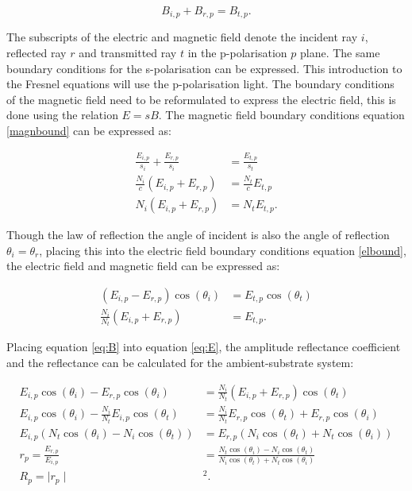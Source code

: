 \documentclass[MasterThesisMain.tex]{subfiles}
\begin{document}
\begin{equation} \label{magnbound}
B_{i,p} + B_{r,p} = B_{t,p}.
\end{equation}

The subscripts of the electric and magnetic field denote the incident ray $i$, reflected ray $r$ and transmitted ray $t$ in the p-polarisation $p$ plane. The same boundary conditions for the s-polarisation can be expressed. This introduction to the Fresnel equations will use the p-polarisation light. The boundary conditions of the magnetic field need to be reformulated to express the electric field, this is done using the relation $E=sB$. The magnetic field boundary conditions equation \ref{magnbound} can be expressed as:

\begin{align}
\frac{E_{i,p}}{s_i} + \frac{E_{r,p}}{s_i} &= \frac{E_{t,p}}{s_t}\\
\frac{N_i}{c}(E_{i,p}+E_{r,p}) &= \frac{N_t}{c}E_{t,p}\\
N_i(E_{i,p}+E_{r,p}) &= N_tE_{t,p}.
\end{align} 

Though the law of reflection the angle of incident is also the angle of reflection $\theta_i=\theta_r$, placing this into the electric field boundary conditions equation \ref{elbound}, the electric field and magnetic field can be expressed as:

\begin{align}
(E_{i,p}-E_{r,p})\cos(\theta_i) &= E_{t,p}\cos(\theta_t) \label{eq:E}\\
\frac{N_i}{N_t}(E_{i,p}+E_{r,p}) &= E_{t,p}. \label{eq:B}
\end{align}

Placing equation \ref{eq:B} into equation \ref{eq:E}, the amplitude reflectance coefficient and the reflectance can be calculated for the ambient-substrate system:

\begin{align}
E_{i,p}\cos(\theta_i)-E_{r,p}\cos(\theta_i) &= \frac{N_i}{N_t}(E_{i,p}+E_{r,p}) \cos(\theta_t) \\
E_{i,p}\cos(\theta_i) - \frac{N_i}{N_t}E_{i,p} \cos(\theta_t) &= \frac{N_i}{N_t}E_{r,p} \cos(\theta_t) + E_{r,p} \cos(\theta_i)\\
E_{i,p}(N_t\cos(\theta_i)-N_i\cos(\theta_t)) &= E_{r,p}(N_i\cos(\theta_t)+N_t\cos(\theta_i))\\
r_p = \frac{E_{r,p}}{E_{i,p}} &= \frac{N_t\cos(\theta_i)-N_i\cos(\theta_t)}{N_i\cos(\theta_t)+N_t\cos(\theta_i)} \label{eq:a-srefl}\\
R_p = \mid r_p \mid &^2.
\end{align}
\end{document}
